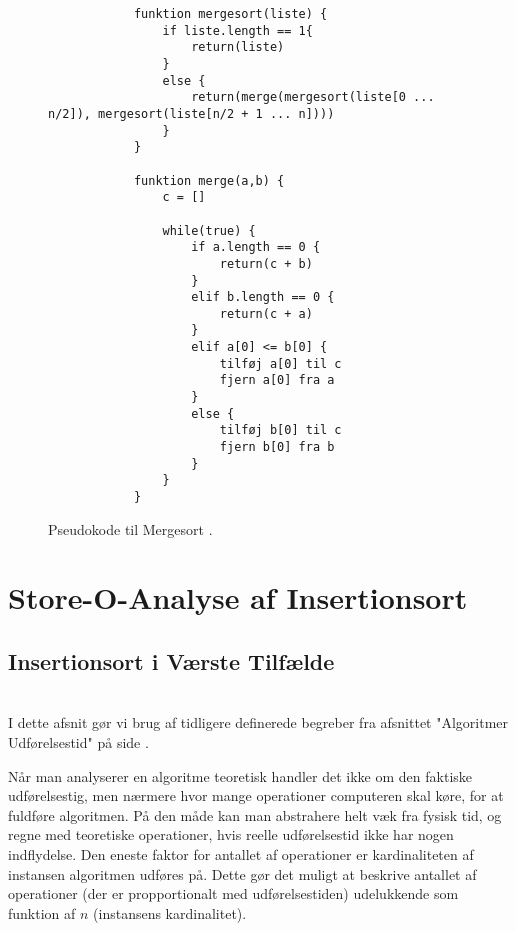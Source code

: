 \begin{figure}
	\begin{center}
		\begin{lstlisting}
			funktion mergesort(liste) {
				if liste.length == 1{
					return(liste)
				}
				else {
					return(merge(mergesort(liste[0 ... n/2]), mergesort(liste[n/2 + 1 ... n])))
				}
			}

			funktion merge(a,b) {
				c = []

				while(true) {
					if a.length == 0 {
						return(c + b)
					}
					elif b.length == 0 {
						return(c + a)
					}
					elif a[0] <= b[0] {
						tilføj a[0] til c
						fjern a[0] fra a
					}
					else {
						tilføj b[0] til c
						fjern b[0] fra b
					}
				}
			}

		\end{lstlisting}
	\end{center}
	\vspace{-5mm}
	\caption{Pseudokode til Mergesort \cite[s. 106]{aogd}.}
	\label{fig:Pseudokode til mergesort}
\end{figure}


\section{Store-O-Analyse af Insertionsort}
\label{sec:Analyse af Insertionsort}

\subsection{Insertionsort i Værste Tilfælde}%
\label{sub:Insertionsort i Værste Tilfælde}


\cite[s. 42]{aogd}\\

I dette afsnit gør vi brug af tidligere definerede begreber fra afsnittet "Algoritmer Udførelsestid" på side \pageref{ch:Algoritmers Udførelsestid}.

Når man analyserer en algoritme teoretisk handler det ikke om den faktiske udførelsestig, men nærmere hvor mange operationer computeren skal køre, for at fuldføre algoritmen. På den måde kan man abstrahere helt væk fra fysisk tid, og regne med teoretiske operationer, hvis reelle udførelsestid ikke har nogen indflydelse. Den eneste faktor for antallet af operationer er kardinaliteten af instansen algoritmen udføres på. Dette gør det muligt at beskrive antallet af operationer (der er propportionalt med udførelsestiden) udelukkende som funktion af $n$ (instansens kardinalitet).\\


